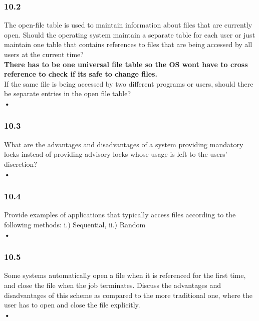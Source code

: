 \documentclass[a4paper,10pt,titlepage]{report}
\begin{document}
\subsubsection{10.2}
The open-file table is used to maintain information about files that are currently open. Should the operating system maintain a separate table for each user or just maintain one table that contains references to files that are being accessed by all users at the current time?\\
\hspace{15mm} \textbf{There has to be one universal file table so the OS wont have to cross reference to check if its safe to change files.} \\


If the same file is being accessed by two different programs or users, should there be separate entries in the open file table? \\
\hspace{15mm} \textbf{•} \\


\subsubsection{10.3}
What are the advantages and disadvantages of a system providing mandatory locks instead of providing advisory locks whose usage is left to the users' discretion? \\
\hspace{15mm} \textbf{•} \\



\subsubsection{10.4}
Provide examples of applications that typically access files according to the following methods: i.) Sequential, ii.) Random \\
\hspace{15mm} \textbf{•} \\


\subsubsection{10.5}
Some systems automatically open a file when it is referenced for the first time, and close the file when the job terminates. Discuss the advantages and disadvantages of this scheme as compared to the more traditional one, where the user has to open and close the file explicitly. \\
\hspace{15mm} \textbf{•} \\
\end{document}
